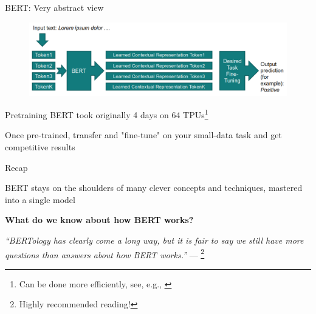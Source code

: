 \documentclass[12pt,aspectratio=169,handout]{beamer}
\begin{document}
\begin{frame}{BERT: Very abstract view}
	
	\begin{figure}
		\includegraphics[width=\linewidth]{img/bert1.png}
	\end{figure}	
	
	Pretraining BERT took originally 4 days on 64 TPUs\footnote{Can be done more efficiently, see, e.g., \citet{izsak-etal-2021-train}}
	
	\bigskip
	
	Once pre-trained, transfer and "fine-tune" on your small-data task and get competitive results


	

	
\end{frame}


\begin{frame}{Recap}
	
	BERT stays on the shoulders of many clever concepts and techniques, mastered into a single model
	
\textbf{What do we know about how BERT works?}

	
\emph{``BERTology has clearly come a long way, but it is fair to say we still have more questions than answers about how BERT works.''} --- \citet{Rogers.et.al.2020.BERT}\footnote{Highly recommended reading!}
	
	
	
\end{frame}
\end{document}
